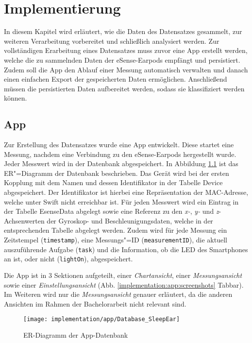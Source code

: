 \chapter{Implementierung}
\label{ch:Implementierung}

In diesem Kapitel wird erläutert, wie die Daten des Datensatzes gesammelt, zur weiteren Verarbeitung vorbereitet und schließlich analysiert werden.
Zur vollständigen Erarbeitung eines Datensatzes muss zuvor eine App erstellt werden, welche die zu sammelnden Daten der eSense-Earpods empfängt und persistiert. 
Zudem soll die App den Ablauf einer Messung automatisch verwalten und danach einen einfachen Export der gespeicherten Daten ermöglichen.
Anschließend müssen die persistierten Daten aufbereitet werden, sodass sie klassifiziert werden können.

\section{App}
\label{ch:Implementierung:app}
Zur Erstellung des Datensatzes wurde eine App entwickelt.
Diese startet eine Messung, nachdem eine Verbindung zu den eSense-Earpods hergestellt wurde.
Jeder Messwert wird in der Datenbank abgespeichert.
In Abbildung \ref{implementation:app:erModel} ist das ER"=Diagramm der Datenbank beschrieben.
Das Gerät wird bei der ersten Kopplung mit dem Namen und dessen Identifikator in der Tabelle {\glqq Device\grqq} abgespeichert.
Der Identifikator ist hierbei eine Repräsentation der MAC-Adresse, welche unter Swift nicht erreichbar ist.
Für jeden Messwert wird ein Eintrag in der Tabelle {\glqq EsenseData\grqq} abgelegt sowie eine Referenz zu den \textit{x-}, \textit{y-} und \textit{z}-Achsenwerten der Gyroskop- und Beschleunigungsdaten, welche in der entsprechenden Tabelle abgelegt werden.
Zudem wird für jede Messung ein Zeitstempel (\texttt{timestamp}), eine Messungs"=ID (\texttt{measurementID}), die aktuell auszuführende Aufgabe (\texttt{task}) und die Information, ob die LED des Smartphones an ist, oder nicht (\texttt{lightOn}), abgespeichert.

Die App ist in 3 Sektionen aufgeteilt, einer \textit{Chartansicht}, einer \textit{Messungsansicht} sowie einer \textit{Einstellungsansicht} (Abb. \ref{implementation:app:screenshots} Tabbar).
Im Weiteren wird nur die \textit{Messungsansicht} genauer erläutert, da die anderen Ansichten im Rahmen der Bachelorarbeit nicht relevant sind.

\begin{figure}[ht]
  \centering
  \texttt{[image: implementation/app/Database\_SleepEar]}
  \caption{ER-Diagramm der App-Datenbank}
  \label{implementation:app:erModel}
\end{figure}

